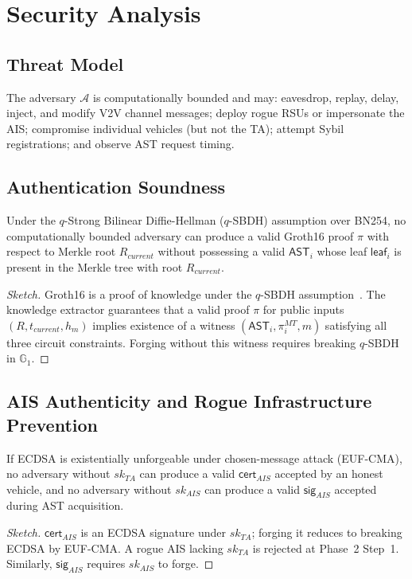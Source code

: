 \section{Security Analysis}
\label{sec:security}

\subsection{Threat Model}

The adversary $\mathcal{A}$ is computationally bounded and may: eavesdrop, replay,
delay, inject, and modify V2V channel messages; deploy rogue RSUs or impersonate the
AIS; compromise individual vehicles (but not the TA); attempt Sybil registrations;
and observe AST request timing.

\subsection{Authentication Soundness}

\begin{theorem}
Under the $q$-Strong Bilinear Diffie-Hellman ($q$-SBDH) assumption over BN254, no
computationally bounded adversary can produce a valid Groth16 proof $\pi$ with
respect to Merkle root $R_{current}$ without possessing a valid $\mathsf{AST}_i$
whose leaf $\mathsf{leaf}_i$ is present in the Merkle tree with root $R_{current}$.
\end{theorem}
\begin{proof}[Sketch]
Groth16 is a proof of knowledge under the $q$-SBDH assumption~\cite{groth2016}.
The knowledge extractor guarantees that a valid proof $\pi$ for public inputs
$(R, t_{current}, h_m)$ implies existence of a witness $(\mathsf{AST}_i, \pi^{MT}_i,
m)$ satisfying all three circuit constraints. Forging without this witness requires
breaking $q$-SBDH in $\mathbb{G}_1$.
\end{proof}

\subsection{AIS Authenticity and Rogue Infrastructure Prevention}

\begin{theorem}
If ECDSA is existentially unforgeable under chosen-message attack (EUF-CMA), no
adversary without $sk_{TA}$ can produce a valid $\mathsf{cert}_{AIS}$ accepted by
an honest vehicle, and no adversary without $sk_{AIS}$ can produce a valid
$\mathsf{sig}_{AIS}$ accepted during AST acquisition.
\end{theorem}
\begin{proof}[Sketch]
$\mathsf{cert}_{AIS}$ is an ECDSA signature under $sk_{TA}$; forging it reduces
to breaking ECDSA by EUF-CMA. A rogue AIS lacking $sk_{TA}$ is rejected at
Phase~2 Step~1. Similarly, $\mathsf{sig}_{AIS}$ requires $sk_{AIS}$ to forge.
\end{proof}

